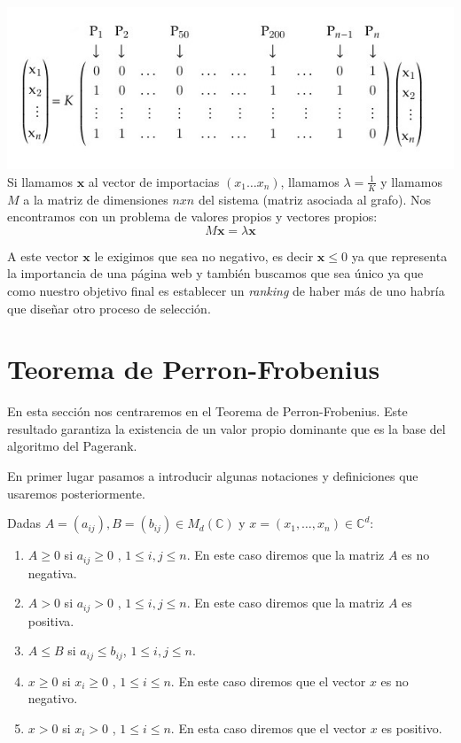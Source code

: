 \documentclass[size=a4, parskip=half, titlepage=false, toc=flat, toc=bib, 12pt]{scrartcl}
\theoremstyle{theorem-style}
\theoremstyle{definition-style}
\theoremstyle{remark-style}
\theoremstyle{example-style}
\theoremstyle{definition-style}
\theoremstyle{remark-style}
\newcommand{\bm}[1]{\boldsymbol{#1}}
\begin{document}
\includegraphics[width=1.0\textwidth]{./img/matrizejemplo}
Si llamamos $\bm{x}$ al vector de importacias $(x_1 \dots x_n)$, llamamos $\lambda = \frac{1}{K}$ y llamamos
$M$ a la matriz de dimensiones $n x n$ del sistema (matriz asociada al grafo). Nos encontramos
con un problema de valores propios y vectores propios:
$$M \bm{x} = \lambda \bm{x} $$

A este vector $\bm{x}$ le exigimos que sea no negativo, es decir $\bm{x} \leq 0$ ya que representa la importancia
de una página web y también buscamos que sea único ya que como nuestro objetivo final es establecer un
\textit{ranking} de haber más de uno habría que diseñar otro proceso de selección.

\newpage

\section{Teorema de Perron-Frobenius}

En esta sección nos centraremos en el Teorema de Perron-Frobenius. Este resultado garantiza la existencia de un valor propio dominante que es la base del algoritmo del Pagerank.

En primer lugar pasamos a introducir algunas notaciones y definiciones que usaremos posteriormente.

Dadas $A = (a_{ij}),B = (b_{ij}) \in M_d(\mathbb{C})$ y $x = (x_1, \dots, x_n)\in \mathbb{C}^d$:
\begin{enumerate}
\item $A\geq 0$ si $a_{ij}\geq 0$ , $1 \leq i,j \leq n$. En este caso diremos que la matriz $A$ es no negativa.
\item $A > 0$ si $a_{ij} > 0$ , $1 \leq i, j \leq n$. En este caso diremos que la matriz $A$ es positiva.
\item $A \leq B$ si $a_{ij} \leq b_{ij}$, $1 \leq i,j \leq n$.
\item $x \geq 0$ si $x_i \geq 0$ , $1 \leq i \leq n$. En este caso diremos que el vector $x$ es no negativo.
\item $x > 0$ si $x_i > 0$ , $1 \leq i \leq n$. En esta caso diremos que el vector $x$ es positivo.
\end{enumerate}
\end{document}
